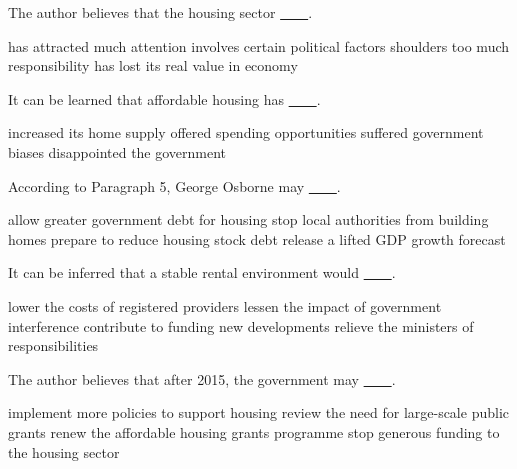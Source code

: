 \item The author believes that the housing sector \uline{~~~~}.
\begin{tasks}
	\task has attracted much attention
	\task involves certain political factors
	\task shoulders too much responsibility
	\task has lost its real value in economy
\end{tasks}
\item It can be learned that affordable housing has \uline{~~~~}.
\begin{tasks}
	\task increased its home supply
	\task offered spending opportunities
	\task suffered government biases
	\task disappointed the government
\end{tasks}
\item According to Paragraph 5, George Osborne may \uline{~~~~}.
\begin{tasks}
	\task allow greater government debt for housing
	\task stop local authorities from building homes
	\task prepare to reduce housing stock debt
	\task release a lifted GDP growth forecast
\end{tasks}
\item It can be inferred that a stable rental environment would \uline{~~~~}.
\begin{tasks}
	\task lower the costs of registered providers
	\task lessen the impact of government interference
	\task contribute to funding new developments
	\task relieve the ministers of responsibilities
\end{tasks}
\item The author believes that after 2015, the government may \uline{~~~~}.
\begin{tasks}
	\task implement more policies to support housing
	\task review the need for large-scale public grants
	\task renew the affordable housing grants programme
	\task stop generous funding to the housing sector
\end{tasks}

